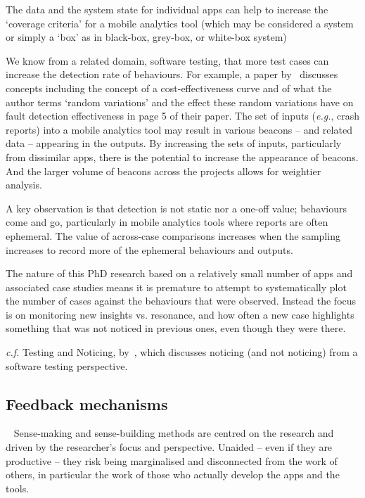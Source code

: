 The data and the system state for individual apps can help to increase the `coverage criteria' for a mobile analytics tool (which may be considered a system or simply a `box' as in black-box, grey-box, or white-box system)%

We know from a related domain, software testing, that more test cases can increase the detection rate of behaviours. For example, a paper by~ discusses concepts including the concept of a cost-effectiveness curve and of what the author terms `random variations' and the effect these random variations have on fault detection effectiveness in page 5 of their paper. The set of inputs (\textit{e.g.}, crash reports) into a mobile analytics tool may result in various beacons -- and related data -- appearing in the outputs. By increasing the sets of inputs, particularly from dissimilar apps, there is the potential to increase the appearance of beacons. And the larger volume of beacons across the projects allows for weightier analysis.

A key observation is that detection is not static nor a one-off value; behaviours come and go, particularly in mobile analytics tools where reports are often ephemeral. The value of across-case comparisons increases when the sampling increases to record more of the ephemeral behaviours and outputs.

The nature of this PhD research based on a relatively small number of apps and associated case studies means it is premature to attempt to systematically plot the number of cases against the behaviours that were observed. Instead the focus is on monitoring 
new insights vs. resonance, and how often a new case highlights something that was not noticed in previous ones, even though they were there. %

\begin{kaobox}[frametitle=Parallels from Software Testing]
\textit{c.f.} Testing and Noticing, by~\textcite{bolton2009_testing_and_noticing}, which discusses noticing (and not noticing) from a software testing perspective.
\end{kaobox}


\subsection{Feedback mechanisms}~\label{methodology-feedback-mechanisms-topic}
Sense-making and sense-building methods are centred on the research and driven by the researcher's focus and perspective. Unaided -- even if they are productive -- they risk being marginalised and disconnected from the work of others, in particular the work of those who actually develop the apps and the tools. 

